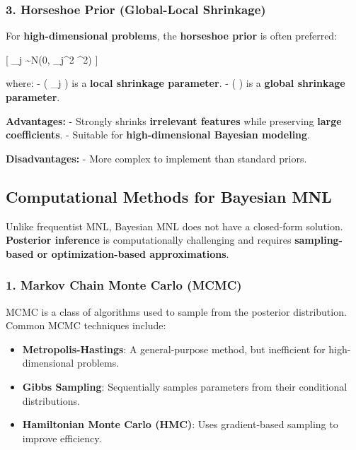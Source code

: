\documentclass[
  letterpaper,
  DIV=11,
  numbers=noendperiod]{scrartcl}
\providecommand{\tightlist}{%
  \setlength{\itemsep}{0pt}\setlength{\parskip}{0pt}}\usepackage{longtable,booktabs,array}
\begin{document}
\subsubsection{\texorpdfstring{3. \textbf{Horseshoe Prior (Global-Local
Shrinkage)}}{3. Horseshoe Prior (Global-Local Shrinkage)}}\label{horseshoe-prior-global-local-shrinkage}

For \textbf{high-dimensional problems}, the \textbf{horseshoe prior} is
often preferred:

{[} \beta\_j \sim N(0, \lambda\_j\^{}2 \tau\^{}2) {]}

where: - ( \lambda\_j ) is a \textbf{local shrinkage parameter}. - (
\tau ) is a \textbf{global shrinkage parameter}.

\textbf{Advantages:} - Strongly shrinks \textbf{irrelevant features}
while preserving \textbf{large coefficients}. - Suitable for
\textbf{high-dimensional Bayesian modeling}.

\textbf{Disadvantages:} - More complex to implement than standard
priors.

\subsection{Computational Methods for Bayesian
MNL}\label{computational-methods-for-bayesian-mnl}

Unlike frequentist MNL, Bayesian MNL does not have a closed-form
solution. \textbf{Posterior inference} is computationally challenging
and requires \textbf{sampling-based or optimization-based
approximations}.

\subsubsection{\texorpdfstring{1. \textbf{Markov Chain Monte Carlo
(MCMC)}}{1. Markov Chain Monte Carlo (MCMC)}}\label{markov-chain-monte-carlo-mcmc}

MCMC is a class of algorithms used to sample from the posterior
distribution. Common MCMC techniques include:

\begin{itemize}
\tightlist
\item
  \textbf{Metropolis-Hastings}: A general-purpose method, but
  inefficient for high-dimensional problems.
\item
  \textbf{Gibbs Sampling}: Sequentially samples parameters from their
  conditional distributions.
\item
  \textbf{Hamiltonian Monte Carlo (HMC)}: Uses gradient-based sampling
  to improve efficiency.
\end{itemize}
\end{document}
